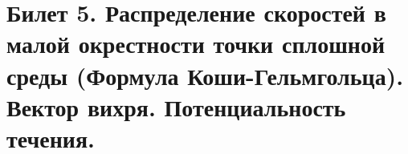 \newpage
\section{Билет 5. Распределение скоростей в малой окрестности точки сплошной среды (Формула Коши-Гельмгольца). Вектор вихря. Потенциальность течения.}